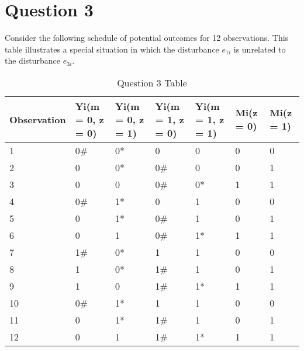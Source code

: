 \documentclass[11pt,notitlepage]{article}\usepackage[]{graphicx}\usepackage[]{color}
\begin{document}
\section*{Question 3}
Consider the following schedule of potential outcomes for 12 observations. This table illustrates a special situation in which the disturbance $e_{1i}$ is unrelated to the disturbance $e_{3i}$.
\begin{table}[H]
  \centering
  \caption{Question 3 Table}
    \begin{tabular}{C{1.5cm}C{1.7cm}C{1.7cm}C{1.7cm}C{1.7cm}C{2cm}C{2cm}}
    \toprule
    Observation  & Yi(m = 0, z = 0)  & Yi(m = 0, z = 1)  & Yi(m = 1, z = 0)  & Yi(m = 1, z = 1)  & Mi(z = 0)  & Mi(z = 1)  \\
         & 0\#     & 0*     & 0     & 0     & 0     & 0 \\
    2     & 0     & 0*     & 0\#     & 0     & 0     & 1 \\
    3     & 0     & 0     & 0\#     & 0*     & 1     & 1 \\
    4     & 0\#     & 1*     & 0     & 1     & 0     & 0 \\
    5     & 0     & 1*     & 0\#     & 1     & 0     & 1 \\
    6     & 0     & 1     & 0\#     & 1*     & 1     & 1 \\
    7     & 1\#     & 0*     & 1     & 1     & 0     & 0 \\
    8     & 1     & 0*     & 1\#     & 1     & 0     & 1 \\
    9     & 1     & 0     & 1\#     & 1*     & 1     & 1 \\
    10    & 0\#     & 1*     & 1     & 1     & 0     & 0 \\
    11    & 0     & 1*     & 1\#     & 1     & 0     & 1 \\
    12    & 0     & 1     & 1\#     & 1*     & 1     & 1 \\
    \bottomrule
    \end{tabular}%
  \label{tab:addlabel}%
\end{table}%
\end{document}
